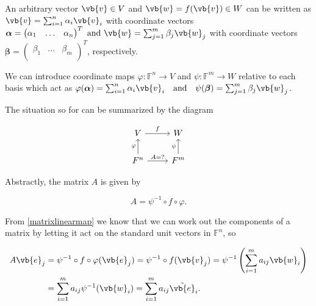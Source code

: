 \documentclass[a4paper,12pt]{report}
\begin{document}
An arbitrary vector \(\vb{v} \in  V\) and \(\vb{w} = f(\vb{v} ) \in  W\) can be written as \(\vb{v} = \sum_{i=1}^{n} \alpha _{i}\vb{v} _{i}  \) with coordinate vectors \(\boldsymbol{\alpha } = \begin{pmatrix}
    \alpha _{1}  & \ldots  & \alpha _{n}   \\
\end{pmatrix}^{T} \text { and } \vb{w} = \sum_{j=1}^{m} \beta _{j} \vb{w} _{j}   \) with coordinate vectors \(\boldsymbol{\beta } = \begin{pmatrix}
    \beta _{1}  & \ldots  & \beta _{m}   \\
\end{pmatrix}^{T} \), respectively. 

We can introduce coordinate maps \(\varphi : \mathbb{F}^{n} \rightarrow V \) and \(\psi  :\mathbb{F}^{m} \rightarrow W\) relative to each basis which act as \(\varphi (\boldsymbol{\alpha } ) = \sum_{i=1}^{n} \alpha _{i} \vb{v} _{i} \text {~~ and ~~} \psi (\boldsymbol{\beta } ) = \sum_{j=1}^{m} \beta _{j} \vb{w} _{j}\).


The situation so for can be summarized by the diagram

\begin{equation}
    \begin{tikzcd}
        V \arrow[r, "f"] & W \\
        F^n \arrow[u, "\varphi"] \arrow[r, "A{=}?"] & F^m \arrow[u, "\psi"]
    \end{tikzcd}
\end{equation}

Abstractly, the matrix \(A\) is given by  

\begin{equation}
    A = \psi ^{-1} \circ f \circ \varphi.
\end{equation}

From \cref{matrixlinearmap} we know that we can work out the components of a matrix by letting it act on the standard unit vectors in \(\mathbb{F}^{n} \), so

\begin{equation}  
    \begin{aligned}
    A\vb{e} _{j} &= \psi ^{-1} \circ f \circ \varphi (\vb{e} _{j} ) =\psi ^{-1} \circ f(\vb{v} _{j} ) = \psi ^{-1} \left( \sum_{i=1}^{m} a_{ij}\vb{w} _{i}   \right) \\ &= \sum_{i=1}^{m} a_{ij} \psi ^{-1} (\vb{w} _{i} ) = \sum_{i=1}^{m} a_{ij}\tilde{\vb{e} }_{i}.     
    \end{aligned}
\end{equation}
\end{document}
